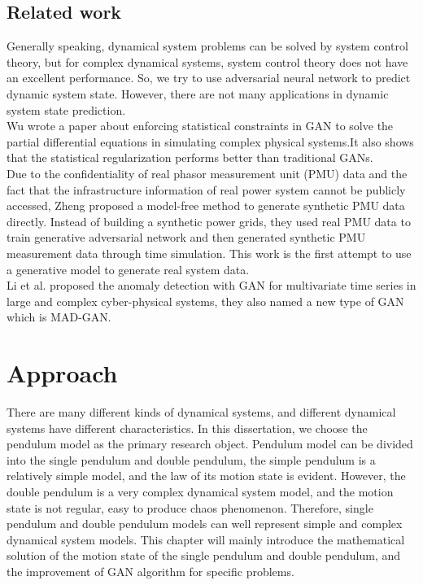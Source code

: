 \documentclass[11pt,a4paper]{article}
\begin{document}
\subsection{Related work}
Generally speaking, dynamical system problems can be solved by system control theory, but for complex dynamical systems, system control theory does not have an excellent performance. So, we try to use adversarial neural network to predict dynamic system state. However, there are not many applications in dynamic system state prediction.
\\
\newline
Wu wrote a paper about enforcing statistical constraints in GAN to solve the partial differential equations in simulating complex physical systems\citep{wu2019enforcing}.It also shows that the statistical regularization performs better than traditional GANs.
\\
\newline
Due to the confidentiality of real phasor measurement unit (PMU) data and the fact that the infrastructure information of real power system cannot be publicly accessed, Zheng proposed a model-free method to generate synthetic PMU data directly. Instead of building a synthetic power grids, they used real PMU data to train generative adversarial network and then generated synthetic PMU measurement data through time simulation. This work is the first attempt to use a generative model to generate real system data\citep{zheng2018synthetic}.
\\
\newline
Li et al. proposed the anomaly detection with GAN for multivariate time series in large and complex cyber-physical systems\citep{li2018anomaly}, they also named a new type of GAN which is MAD-GAN\citep{li2019mad}.
\newpage
\section{Approach}
There are many different kinds of dynamical systems, and different dynamical systems have different characteristics. In this dissertation, we choose the pendulum model as the primary research object. Pendulum model can be divided into the single pendulum and double pendulum, the simple pendulum is a relatively simple model, and the law of its motion state is evident. However, the double pendulum is a very complex dynamical system model, and the motion state is not regular, easy to produce chaos phenomenon. Therefore, single pendulum and double pendulum models can well represent simple and complex dynamical system models. This chapter will mainly introduce the mathematical solution of the motion state of the single pendulum and double pendulum, and the improvement of GAN algorithm for specific problems.
\end{document}
